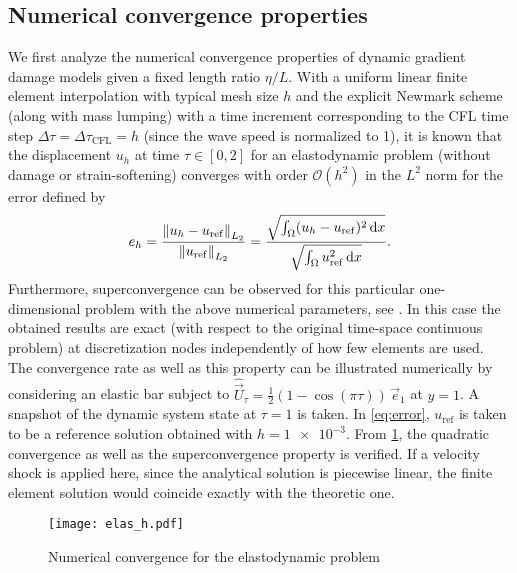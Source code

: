 \subsection{Numerical convergence properties}
We first analyze the numerical convergence properties of dynamic gradient damage models given a fixed length ratio $\eta/L$. With a uniform linear finite element interpolation with typical mesh size $h$ and the explicit Newmark scheme (along with mass lumping) with a time increment corresponding to the CFL time step $\Delta \tau=\Delta \tau_\mathrm{CFL}=h$ (since the wave speed is normalized to 1), it is known that the displacement $u_h$ at time $\tau\in[0,2]$ for an elastodynamic problem (without damage or strain-softening) converges with order $\mathcal{O}(h^2)$ in the $L^2$ norm for the error defined by
\begin{equation} \label{eq:error}
e_h=\frac{\left\lVert{u_h-u_\mathrm{ref}}\right\rVert_{L_2}}{\left\lVert{u_\mathrm{ref}}\right\rVert_{L_2}}=\frac{\sqrt{\int_\Omega(u_h-u_\mathrm{ref})^2\,\mathrm{d}x}}{\sqrt{\int_\Omega u_\mathrm{ref}^2\,\mathrm{d}x}}.
\end{equation}
Furthermore, superconvergence can be observed for this particular one-dimensional problem with the above numerical parameters, see \cite{Hughes:1987}. In this case the obtained results are exact (with respect to the original time-space continuous problem) at discretization nodes independently of how few elements are used. The convergence rate as well as this property can be illustrated numerically by considering an elastic bar subject to $\widehat{\vec{U}}_\tau=\frac{1}{2}(1-\cos(\pi \tau))\,\vec{e}_1$ at $y=1$. A snapshot of the dynamic system state at $\tau=1$ is taken. In \eqref{eq:error}, $u_\mathrm{ref}$ is taken to be a reference solution obtained with $h=\num{1e-3}$. From \cref{fig:elasconv}, the quadratic convergence as well as the superconvergence property is verified. If a velocity shock is applied here, since the analytical solution is piecewise linear, the finite element solution would coincide exactly with the theoretic one.
\begin{figure}[htbp]
\centering
\texttt{[image: elas\_h.pdf]}
\caption{Numerical convergence for the elastodynamic problem} \label{fig:elasconv}
\end{figure}


